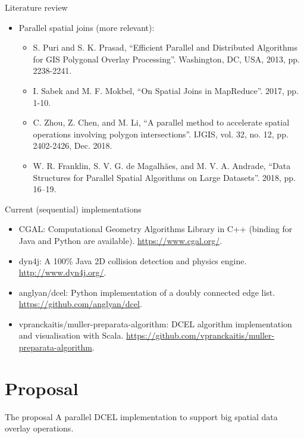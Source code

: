 \documentclass{beamer}
\begin{document}
\begin{frame}{Literature review}
    \begin{itemize}
        \item Parallel spatial joins (more relevant):
        \begin{itemize}
            \item S. Puri and S. K. Prasad, ``Efficient Parallel and Distributed Algorithms for GIS Polygonal Overlay Processing''. Washington, DC, USA, 2013, pp. 2238-2241.
            \item I. Sabek and M. F. Mokbel, ``On Spatial Joins in MapReduce''. 2017, pp. 1-10.
            \item C. Zhou, Z. Chen, and M. Li, ``A parallel method to accelerate spatial operations involving polygon intersections''. IJGIS, vol. 32, no. 12, pp. 2402-2426, Dec. 2018.
            \item W. R. Franklin, S. V. G. de Magalhães, and M. V. A. Andrade, ``Data Structures for Parallel Spatial Algorithms on Large Datasets''. 2018, pp. 16–19.
        \end{itemize}
    \end{itemize}
\end{frame}

\begin{frame}{Current (sequential) implementations}
    \begin{itemize}
        \item CGAL: Computational Geometry Algorithms Library in C++ (binding for Java and Python are available). \url{https://www.cgal.org/}.
        \item dyn4j: A 100\% Java 2D collision detection and physics engine. \url{http://www.dyn4j.org/}.
        \item anglyan/dcel: Python implementation of a doubly connected edge list. \url{https://github.com/anglyan/dcel}.
        \item vpranckaitis/muller-preparata-algorithm: DCEL algorithm implementation and visualisation with Scala. \url{https://github.com/vpranckaitis/muller-preparata-algorithm}.
    \end{itemize}
\end{frame}

\section{Proposal}

\begin{frame}{The proposal}
    \centering
    A parallel DCEL implementation to support big spatial data overlay operations.
\end{frame}
\end{document}
